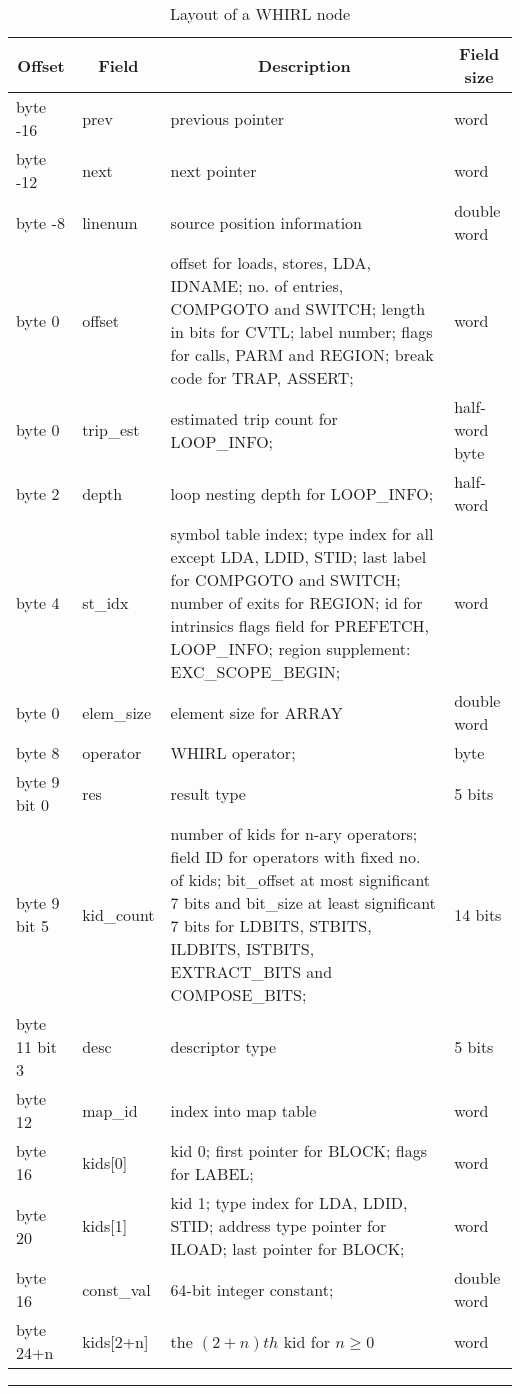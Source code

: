 \documentclass{article}
\begin{document}
\begin{table}[h]
\begin{center}
\begin{tabular}{|l|l|p{3in}|l|}\hline
\multicolumn{1}{|c|}{Offset} &
\multicolumn{1}{|c|}{Field} &
\multicolumn{1}{|c|}{Description} &
\multicolumn{1}{|c|}{Field size} \\\hline\hline
byte -16  & prev & previous pointer & word \\\hline
byte -12 & next & next pointer & word \\\hline
byte -8 & linenum & source position information & double word \\\hline
byte 0  & offset & 
offset for loads, stores, LDA, IDNAME; 
no. of entries, COMPGOTO and SWITCH; 
length in bits for CVTL; 
label number;
flags for calls, PARM and REGION; 
break code for TRAP, ASSERT; & word\\\hline
%
byte 0 & trip\_est & estimated trip count for LOOP\_INFO; & half-word byte\\\hline
%
byte 2  & depth & loop nesting depth for LOOP\_INFO; & half-word \\\hline
byte 4 & st\_idx & symbol table index; 
type index for all except LDA, LDID, STID;
last label for COMPGOTO and SWITCH;
number of exits for REGION;
id for intrinsics
flags field for PREFETCH, LOOP\_INFO;
region supplement: EXC\_SCOPE\_BEGIN;
& word \\\hline
%
byte 0 & elem\_size & element size for ARRAY & double word \\\hline\hline
%
byte 8 & operator & WHIRL operator;  & byte \\\hline 
%
byte 9 bit 0 & res & result type& 5 bits\\\hline 
%
byte 9 bit 5  & kid\_count  & number of kids for n-ary operators; field ID for
operators with fixed no. of kids;
bit\_offset at most significant 7 bits and bit\_size at least significant
7 bits for LDBITS, STBITS, ILDBITS, ISTBITS, EXTRACT\_BITS and
COMPOSE\_BITS; & 14 bits\\\hline
%
byte 11 bit 3 & desc  & descriptor type & 5 bits \\\hline
%
byte 12  & map\_id & index into map table & word \\\hline
byte 16  & kids[0] & kid 0; first pointer for BLOCK; flags for LABEL; & word \\\hline
byte 20  & kids[1] & kid 1; type index for LDA, LDID, STID; address type pointer for ILOAD; last pointer for BLOCK; & word \\\hline
byte 16  & const\_val & 64-bit integer constant; & double word \\\hline
byte 24+n  & kids[2+n] & the $(2+n)th$ kid for $n \geq 0$ & word \\\hline
\hline
\end{tabular}
\end{center}
\vspace{2ex}
\hrule
\caption{Layout of a WHIRL node}
\label{whirl-node-layout}
\end{table}
\end{document}

